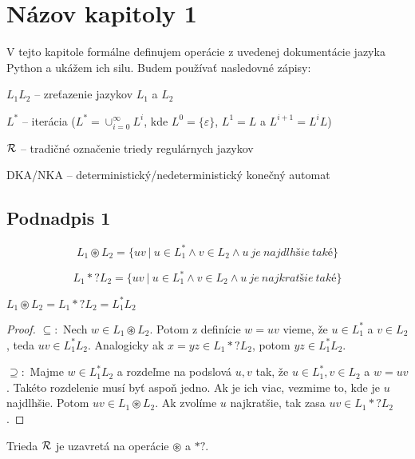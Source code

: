 \chapter{Názov kapitoly 1}
\label{chap:kapitola1}

V tejto kapitole formálne definujem operácie z uvedenej dokumentácie jazyka Python \cite{Python3Documentation} a ukážem ich silu. Budem používať nasledovné zápisy:

$ L_{1}L_{2} $ -- zreťazenie jazykov $ L_{1} $ a $ L_{2} $

$ L^* $ -- iterácia ($L^*=\cup^{\infty}_{i=0}L^i$, kde $L^0=\lbrace \varepsilon \rbrace$, $L^1=L$ a $L^{i+1}=L^iL$)

$ {\cal R} $ -- tradičné označenie triedy regulárnych jazykov

DKA/NKA -- deterministický/nedeterministický konečný automat

\section{Podnadpis 1}
\label{chap:podkapitola1}

\begin{df}
$$ L_{1} \circledast L_{2} = \lbrace uv ~|~ u \in L_1^* \land v \in L_2 \land u~je~najdlhšie~také \rbrace$$
\end{df}

\begin{df}
$$ L_{1} *? L_{2} = \lbrace uv ~|~ u \in L_1^* \land v \in L_2 \land u~je~najkratšie~také \rbrace $$
\end{df}

\begin{veta}
$L_1 \circledast L_2 = L_1 *? L_2 = L_1^*L_2$
\end{veta}
\begin{proof}
$\subseteq:$
Nech $w \in L_1 \circledast L_2$. Potom z definície $w=uv$ vieme, že $u \in L_1^*$ a $v \in L_2$, teda $uv \in L_1^*L_2$. Analogicky ak $x=yz \in L_1 *? L_2$, potom $yz \in L_1^*L_2$.

$\supseteq:$
Majme $w \in L_1^*L_2$ a rozdeľme na podslová $u,v$ tak, že $u \in L_1^*, v \in L_2$ a $w=uv$. Takéto rozdelenie musí byť aspoň jedno. Ak je ich viac, vezmime to, kde je $u$ najdlhšie. Potom $uv \in L_1 \circledast L_2$. Ak zvolíme $u$ najkratšie, tak zasa $uv \in L_1 *? L_2$.
\end{proof}

\begin{dosledok}
Trieda ${\cal R}$ je uzavretá na operácie $\circledast$ a $*?$.
\end{dosledok}

